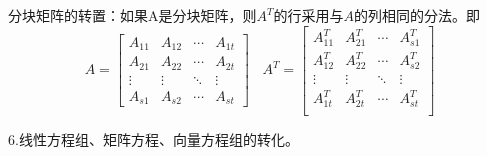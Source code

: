 \documentclass{article}
\begin{document}
分块矩阵的转置：如果A是分块矩阵，则$A^{T}$的行采用与$A$的列相同的分法。即
\begin{equation*}
A=
  \begin{bmatrix}
    A_{11} & A_{12} & \cdots & A_{1t}\\
   A_{21} & A_{22} & \cdots & A_{2t}\\
   \vdots & \vdots & \ddots & \vdots\\
   A_{s1} & A_{s2} & \cdots & A_{st}
  \end{bmatrix}
  ~~~~A^{T}=
  \begin{bmatrix}
    A_{11}^{T} & A_{21}^{T} & \cdots & A_{s1}^{T} \\
    A_{12}^{T} & A_{22}^{T} & \cdots & A_{s2}^{T} \\
    \vdots & \vdots & \ddots & \vdots\\
    A_{1t}^{T} & A_{2t}^{T} & \cdots & A_{st}^{T} \\
  \end{bmatrix}
\end{equation*}

6.线性方程组、矩阵方程、向量方程组的转化。
\end{document}
